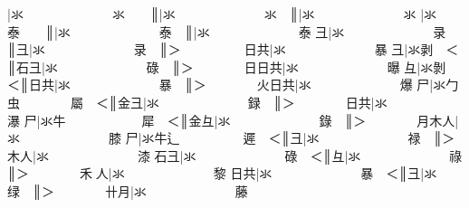 {\cjk{}{\cnsym{}　　　　　　}}|{\cjk{}氺{\cnsym{}　　　　　　　}氺{\cnsym{}　　}}║{\cjk{}{\cnsym{}　　　　　　　}}|{\cjk{}氺{\cnsym{}　　　　　　　}氺{\cnsym{}　}}║{\cjk{}{\cnsym{}　　　　　　　　}}|{\cjk{}氺{\cnsym{}　　　　　　　}氺} 
{\cjk{}{\cnsym{}　　　　　}}|{\cjk{}氺{\cnsym{}　　　　　　　}泰{\cnsym{}　　}}║{\cjk{}{\cnsym{}　　　　　　}}|{\cjk{}氺{\cnsym{}　　　　　　　}泰{\cnsym{}　}}║{\cjk{}{\cnsym{}　　　　　　　}}|{\cjk{}氺{\cnsym{}　　　　　　　}泰} 
{\cjk{}{\cnsym{}　　　　　}彐}|{\cjk{}氺{\cnsym{}　　　　　　　}录{\cnsym{}　　}}║{\cjk{}{\cnsym{}　　　　　　}彐}|{\cjk{}氺{\cnsym{}　　　　　　　}录{\cnsym{}　}}║{\cjk{}＞{\cnsym{}　　　　　}日共}|{\cjk{}氺{\cnsym{}　　　　　　　}暴} 
{\cjk{}{\cnsym{}　　　　　}彐}|{\cjk{}氺剥{\cnsym{}　}＜}║{\cjk{}{\cnsym{}　　　　　}石彐}|{\cjk{}氺{\cnsym{}　　　　　　　}碌{\cnsym{}　}}║{\cjk{}＞{\cnsym{}　　　　}日日共}|{\cjk{}氺{\cnsym{}　　　　　　　}曝} 
{\cjk{}{\cnsym{}　　　　　}彑}|{\cjk{}氺剝{\cnsym{}　}＜}║{\cjk{}{\cnsym{}　　　　　}日共}|{\cjk{}氺{\cnsym{}　　　　　　　}暴{\cnsym{}　}}║{\cjk{}＞{\cnsym{}　　　　}火日共}|{\cjk{}氺{\cnsym{}　　　　　　　}爆} 
{\cjk{}{\cnsym{}　　　　　}尸}|{\cjk{}氺勹虫{\cnsym{}　　　　}屬{\cnsym{}　}＜}║{\cjk{}{\cnsym{}　　　　　}金彐}|{\cjk{}氺{\cnsym{}　　　　　　　}録{\cnsym{}　}}║{\cjk{}＞{\cnsym{}　　　　}日共}|{\cjk{}氺{\cnsym{}　　　　　　　}瀑} 
{\cjk{}{\cnsym{}　　　　　}尸}|{\cjk{}氺牛{\cnsym{}　　　　　　}犀{\cnsym{}　}＜}║{\cjk{}{\cnsym{}　　　　　}金彑}|{\cjk{}氺{\cnsym{}　　　　　　　}錄{\cnsym{}　}}║{\cjk{}＞{\cnsym{}　　　　}月木人}|{\cjk{}氺{\cnsym{}　　　　　　　}膝} 
{\cjk{}{\cnsym{}　　　　　}尸}|{\cjk{}氺牛辶{\cnsym{}　　　　　}遲{\cnsym{}　}＜}║{\cjk{}{\cnsym{}　　　　　}彐}|{\cjk{}氺{\cnsym{}　　　　　　　}禄{\cnsym{}　}}║{\cjk{}＞{\cnsym{}　　　　}木人}|{\cjk{}氺{\cnsym{}　　　　　　　}漆} 
{\cjk{}{\cnsym{}　　　　}石彐}|{\cjk{}氺{\cnsym{}　　　　　　　}碌{\cnsym{}　}＜}║{\cjk{}{\cnsym{}　　　　　}彑}|{\cjk{}氺{\cnsym{}　　　　　　　}祿{\cnsym{}　}}║{\cjk{}＞{\cnsym{}　　　　}禾{\cnjzr{}}人}|{\cjk{}氺{\cnsym{}　　　　　　　}黎} 
{\cjk{}{\cnsym{}　　　　}日共}|{\cjk{}氺{\cnsym{}　　　　　　　}暴{\cnsym{}　}＜}║{\cjk{}{\cnsym{}　　　　　}彐}|{\cjk{}氺{\cnsym{}　　　　　　　}绿{\cnsym{}　}}║{\cjk{}＞{\cnsym{}　　　　}卄月}|{\cjk{}氺{\cnsym{}　　　　　　　}藤} 
